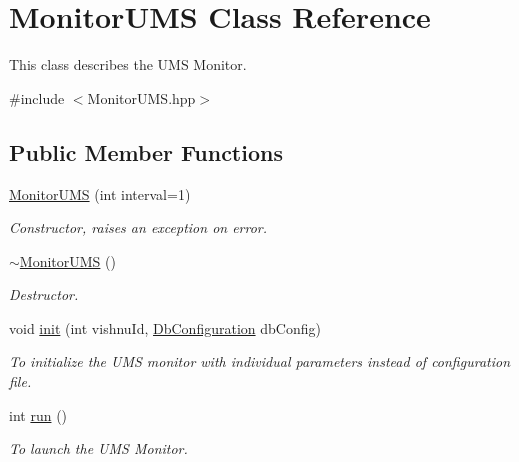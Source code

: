 \hypertarget{classMonitorUMS}{
\section{MonitorUMS Class Reference}
\label{classMonitorUMS}
}


This class describes the UMS Monitor.  




{\ttfamily \#include $<$MonitorUMS.hpp$>$}

\subsection*{Public Member Functions}
\begin{DoxyCompactItemize}
\item 
\hyperlink{classMonitorUMS_ab3e7af32b9eb1e778ade65438d52fd8b}{MonitorUMS} (int interval=1)
\begin{DoxyCompactList}\small\item\em Constructor, raises an exception on error. \item\end{DoxyCompactList}\item 
\hypertarget{classMonitorUMS_a4dd94f7d4a5cfafb4c668cde6f231e3e}{
\hyperlink{classMonitorUMS_a4dd94f7d4a5cfafb4c668cde6f231e3e}{$\sim$MonitorUMS} ()}
\label{classMonitorUMS_a4dd94f7d4a5cfafb4c668cde6f231e3e}

\begin{DoxyCompactList}\small\item\em Destructor. \item\end{DoxyCompactList}\item 
void \hyperlink{classMonitorUMS_a14c0a0e214e1c3dd306314474d6a3ff8}{init} (int vishnuId, \hyperlink{classDbConfiguration}{DbConfiguration} dbConfig)
\begin{DoxyCompactList}\small\item\em To initialize the UMS monitor with individual parameters instead of configuration file. \item\end{DoxyCompactList}\item 
int \hyperlink{classMonitorUMS_aa4e9d26960b0519c7bfd4e470d1fc0a7}{run} ()
\begin{DoxyCompactList}\small\item\em To launch the UMS Monitor. \item\end{DoxyCompactList}\end{DoxyCompactItemize}
